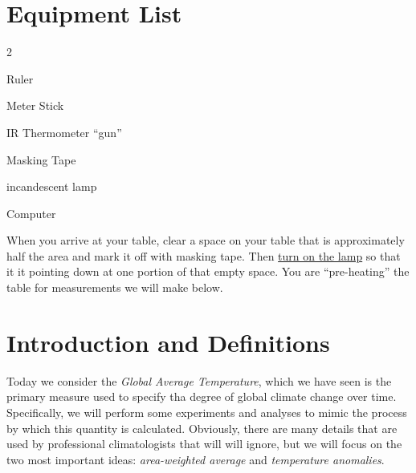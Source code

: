 


\section*{Equipment List}

\begin{multicols}{2}   %
\begin{equipment}
  \item Ruler
  \item Meter Stick
  \item IR Thermometer ``gun''
  \item Masking Tape
  \item incandescent lamp
  \item Computer
\end{equipment}
\end{multicols}

\vspace{0.5cm}
 When you arrive at your table, clear a space on your table that is approximately half the area and mark it off with masking tape.  Then \underline{turn on the lamp} so that it it pointing down at one portion of that empty space.  You are ``pre-heating'' the table for measurements we will make below.

\section{Introduction and Definitions}

Today we consider the {\em Global Average Temperature}, which we have seen is the primary measure used to specify tha degree of global climate change over time.  Specifically, we will perform some experiments and analyses to mimic the process by which this quantity is calculated.  Obviously, there are many details that are used by professional climatologists that will will ignore, but we will focus on the two most important ideas: {\em area-weighted average} and {\em temperature anomalies}.

